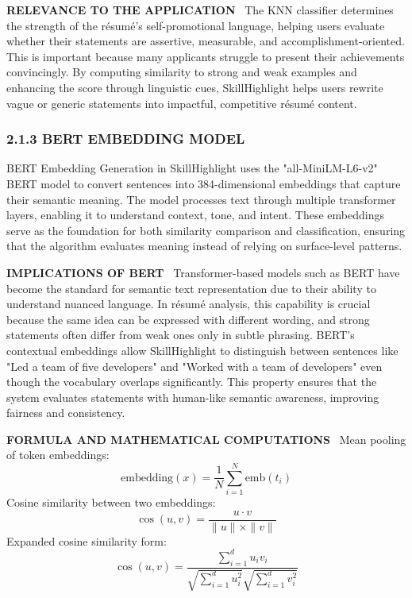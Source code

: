 \documentclass[12pt]{article}
\renewcommand{\paragraph}[1]{\noindent\textbf{\MakeUppercase{#1}}\ }
\begin{document}
\paragraph{RELEVANCE TO THE APPLICATION}
The KNN classifier determines the strength of the résumé's self-promotional language, helping users evaluate whether their statements are assertive, measurable, and accomplishment-oriented. This is important because many applicants struggle to present their achievements convincingly. By computing similarity to strong and weak examples and enhancing the score through linguistic cues, SkillHighlight helps users rewrite vague or generic statements into impactful, competitive résumé content.

\subsubsection*{2.1.3 BERT EMBEDDING MODEL}
BERT Embedding Generation in SkillHighlight uses the "all-MiniLM-L6-v2" BERT model to convert sentences into 384-dimensional embeddings that capture their semantic meaning. The model processes text through multiple transformer layers, enabling it to understand context, tone, and intent. These embeddings serve as the foundation for both similarity comparison and classification, ensuring that the algorithm evaluates meaning instead of relying on surface-level patterns.

\paragraph{IMPLICATIONS OF BERT}
Transformer-based models such as BERT have become the standard for semantic text representation due to their ability to understand nuanced language. In résumé analysis, this capability is crucial because the same idea can be expressed with different wording, and strong statements often differ from weak ones only in subtle phrasing. BERT's contextual embeddings allow SkillHighlight to distinguish between sentences like "Led a team of five developers" and "Worked with a team of developers" even though the vocabulary overlaps significantly. This property ensures that the system evaluates statements with human-like semantic awareness, improving fairness and consistency.

\paragraph{FORMULA AND MATHEMATICAL COMPUTATIONS}
Mean pooling of token embeddings:
\[
\text{embedding}(x) = \frac{1}{N} \sum_{i=1}^N \text{emb}(t_i)
\]
Cosine similarity between two embeddings:
\[
\cos(u, v) = \frac{u \cdot v}{\|u\| \times \|v\|}
\]
Expanded cosine similarity form:
\[
\cos(u, v) = \frac{\sum_{i=1}^d u_i v_i}{\sqrt{\sum_{i=1}^d u_i^2} \sqrt{\sum_{i=1}^d v_i^2}}
\]
\end{document}
